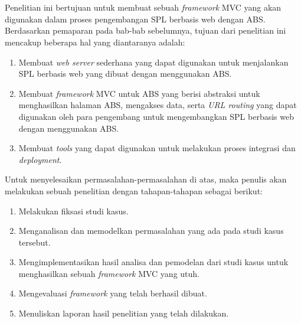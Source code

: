 \chapter{\babLima}

Penelitian ini bertujuan untuk membuat sebuah \textit{framework} MVC yang akan digunakan dalam proses pengembangan SPL berbasis web dengan ABS. Berdasarkan pemaparan pada bab-bab sebelumnya, tujuan dari penelitian ini mencakup beberapa hal yang diantaranya adalah:

\begin{enumerate}
    \item Membuat \textit{web server} sederhana yang dapat digunakan untuk menjalankan SPL berbasis web yang dibuat dengan menggunakan ABS.
    \item Membuat \textit{framework} MVC untuk ABS yang berisi abstraksi untuk menghasilkan halaman ABS, mengakses data, serta \textit{URL routing} yang dapat digunakan oleh para pengembang untuk mengembangkan SPL berbasis web dengan menggunakan ABS.
    \item Membuat \textit{tools} yang dapat digunakan untuk melakukan proses integrasi dan \textit{deployment}.
\end{enumerate}

\noindent
Untuk menyelesaikan permasalahan-permasalahan di atas, maka penulis akan melakukan sebuah penelitian dengan tahapan-tahapan sebagai berikut:

\begin{enumerate}
    \item Melakukan fiksasi studi kasus.
    \item Menganalisan dan memodelkan permasalahan yang ada pada studi kasus tersebut.
    \item Mengimplementasikan hasil analisa dan pemodelan dari studi kasus untuk menghasilkan sebuah \textit{framework} MVC yang utuh.
    \item Mengevaluasi \textit{framework} yang telah berhasil dibuat.
    \item Menuliskan laporan hasil penelitian yang telah dilakukan.
\end{enumerate}